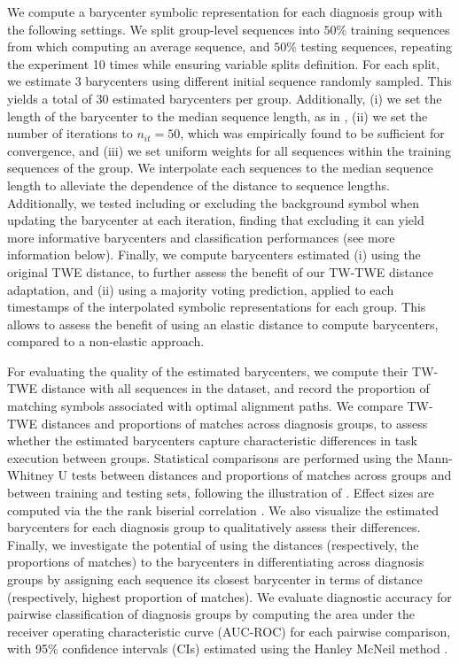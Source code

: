 \begin{chapterabstract}
        We compute a barycenter symbolic representation for each diagnosis group with the following settings. We split group-level sequences into $50\%$ training sequences from which computing an average sequence, and $50\%$ testing sequences, repeating the experiment 10 times while ensuring variable splits definition. For each split, we estimate 3 barycenters using different initial sequence randomly sampled. This yields a total of 30 estimated barycenters per group. Additionally, (i) we set the length of the barycenter to the median sequence length, as in , (ii) we set the number of iterations to $n_{it}=50$, which was empirically found to be sufficient for convergence, and (iii) we set uniform weights for all sequences within the training sequences of the group. We interpolate each sequences to the median sequence length to alleviate the dependence of the distance to sequence lengths. Additionally, we tested including or excluding the background symbol when updating the barycenter at each iteration, finding that excluding it can yield more informative barycenters and classification performances (see more information below). Finally, we compute barycenters estimated (i) using the original TWE distance, to further assess the benefit of our TW-TWE distance adaptation, and (ii) using a majority voting prediction, applied to each timestamps of the interpolated symbolic representations for each group. This allows to assess the benefit of using an elastic distance to compute barycenters, compared to a non-elastic approach.
        
        For evaluating the quality of the estimated barycenters, we compute their TW-TWE distance with all sequences in the dataset, and record the proportion of matching symbols associated with optimal alignment paths. We compare TW-TWE distances and proportions of matches across diagnosis groups, to assess whether the estimated barycenters capture characteristic differences in task execution between groups. Statistical comparisons are performed using the Mann-Whitney U tests \cite{mwu} between distances and proportions of matches across groups and between training and testing sets, following the illustration of . Effect sizes are computed via the the rank biserial correlation \cite{biserial}. We also visualize the estimated barycenters for each diagnosis group to qualitatively assess their differences. Finally, we investigate the potential of using the distances (respectively, the proportions of matches) to the barycenters in differentiating across diagnosis groups by assigning each sequence its closest barycenter in terms of distance (respectively, highest proportion of matches). We evaluate diagnostic accuracy for pairwise classification of diagnosis groups by computing the area under the receiver operating characteristic curve (AUC-ROC) for each pairwise comparison, with 95\% confidence intervals (CIs) estimated using the Hanley McNeil method \cite{Hanley1982}.


\end{chapterabstract}
